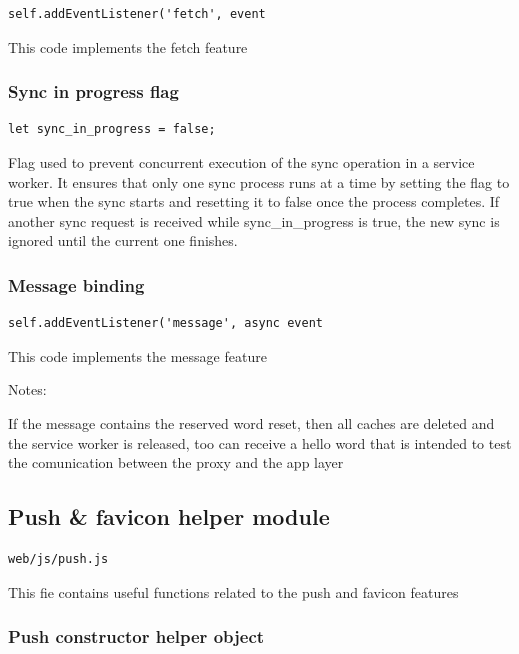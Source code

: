 \documentclass[a4paper]{article}
\begin{document}
\begin{lstlisting}
self.addEventListener('fetch', event
\end{lstlisting}

This code implements the fetch feature

\hypertarget{toc275}{}
\subsubsection{Sync in progress flag}

\begin{lstlisting}
let sync_in_progress = false;
\end{lstlisting}

Flag used to prevent concurrent execution of the sync operation in a service worker.
It ensures that only one sync process runs at a time by setting the flag to true
when the sync starts and resetting it to false once the process completes. If another
sync request is received while sync\_in\_progress is true, the new sync is ignored
until the current one finishes.

\hypertarget{toc276}{}
\subsubsection{Message binding}

\begin{lstlisting}
self.addEventListener('message', async event
\end{lstlisting}

This code implements the message feature

Notes:

If the message contains the reserved word reset, then all caches are deleted
and the service worker is released, too can receive a hello word that is intended
to test the comunication between the proxy and the app layer

\hypertarget{toc277}{}
\subsection{Push \& favicon helper module}

\begin{lstlisting}
web/js/push.js
\end{lstlisting}

This fie contains useful functions related to the push and favicon features

\hypertarget{toc278}{}
\subsubsection{Push constructor helper object}
\end{document}
